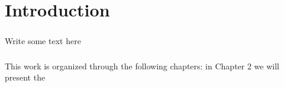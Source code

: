 \chapter{Introduction}
\paragraph{}
Write some text here

\paragraph{}
This work is organized through the following chapters: in Chapter 2 we will present the 


